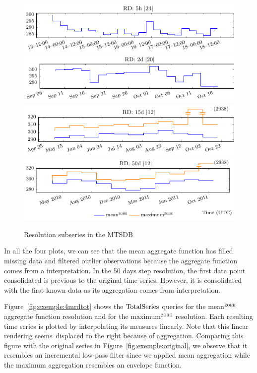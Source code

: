 \begin{figure}[tp]
  \centering
  \includegraphics{fig_exemple_4mrd1.pdf}
  \includegraphics{fig_exemple_4mrd2.pdf}
  \includegraphics{fig_exemple_4mrd3.pdf}
  \includegraphics{fig_exemple_4mrd4.pdf}
  \caption{Resolution subseries in the MTSDB}
  \label{fig:exemple:4mrd}
\end{figure}

In all the four plots, we can see that the mean aggregate function has
filled missing data and filtered outlier observations because the
aggregate function comes from a \zohe{} interpretation.  In the 50
days step resolution, the first data point consolidated is previous to
the original time series. However, it is consolidated with the first
known data as its aggregation comes from \zohe{} interpretation.

Figure~\ref{fig:exemple:4mrdtot} shows the $\operatorname{TotalSeries}$ queries for
the mean$^{\zohe}$ aggregate function resolution and for the
maximum$^{\zohe}$ resolution.  Each resulting time series is plotted
by interpolating its measures linearly. Note that this linear
rendering seems displaced to the right because of \zohe{} aggregation.
Comparing this figure with the original series in
Figure~\ref{fig:exemple:original}, we observe that it resembles an
incremental low-pass filter since we applied mean aggregation while
the maximum aggregation resembles an envelope function.

